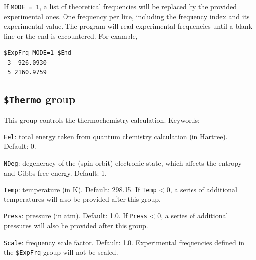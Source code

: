 \documentclass[12pt,english]{extarticle}
\begin{document}
If \verb|MODE = 1|, a list of theoretical frequencies will be replaced by
the provided experimental ones. One frequency per line, including the
frequency index and its experimental value. The program will
read experimental frequencies until a blank line or the end is encountered.
For example,
\begin{Verbatim}[frame=single]
 $ExpFrq MODE=1 $End
 3  926.0930
 5 2160.9759
\end{Verbatim}


\subsection{\texttt{\$Thermo} group} \label{sec:inp-thermo}

This group controls the thermochemistry calculation. Keywords:

\bigskip{}
\verb|Eel|: total energy taken from quantum chemistry calculation (in Hartree). Default: 0.

\bigskip{}
\verb|NDeg|: degeneracy of the (spin-orbit) electronic state, which affects the entropy and Gibbs free energy. Default: 1.

\bigskip{}
\verb|Temp|: temperature (in K). Default: 298.15. If \verb|Temp| < 0, a series of additional temperatures will also be provided after this group.

\bigskip{}
\verb|Press|: pressure (in atm). Default: 1.0. If \verb|Press| < 0, a series of additional pressures will also be provided after this group.

\bigskip{}
\verb|Scale|: frequency scale factor. Default: 1.0. Experimental frequencies defined in the \texttt{\$ExpFrq} group will not be scaled.
\end{document}
